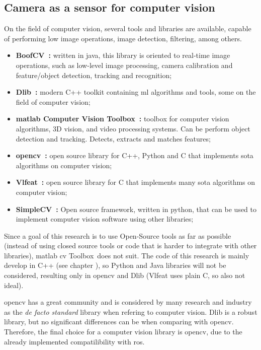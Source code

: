 \subsection{Camera as a sensor for computer vision}
On the field of computer vision, several tools and libraries are available, capable of performing low image operations, image detection, filtering, among others. 

\begin{itemize}
	\item \textbf{BoofCV~\cite{boofcv}:} written in java, this library is oriented to real-time image operations, such as low-level image processing, camera calibration and feature/object  detection, tracking and recognition;
	\item \textbf{Dlib~\cite{dlib}:} modern C++ toolkit containing \acl{ml} algorithms and tools, some on the field of computer vision;
	\item \textbf{\ac{matlab} Computer Vision Toolbox\texttrademark~\cite{matlabcvtoolbox}:} toolbox for computer vision algorithms, 3D vision, and video processing systems. Can be perform object detection and tracking. Detects, extracts and matches features;
	\item \textbf{\acf{opencv}~\cite{opencv}:} open source library for C++, Python and C that implements \acl{sota} algorithms on computer vision;
	\item \textbf{Vlfeat~\cite{vlfeat}:} open source library for C that implements many \acl{sota} algorithms on computer vision;
	\item \textbf{SimpleCV~\cite{simplecv}:} Open source framework, written in python, that can be used to implement computer vision software using other libraries;
\end{itemize}

Since a goal of this research is to use Open-Source tools as far as possible (instead of using closed source tools or code that is harder to integrate with other libraries), \ac{matlab} \acl{cv} Toolbox\texttrademark~does not suit. The code of this research is mainly develop in C++ (see chapter \citeneeded), so Python and Java libraries will not be considered, resulting only in \ac{opencv} and Dlib (Vlfeat uses plain C, so also not ideal). 

\ac{opencv} has a great community and is considered by many research and industry as the \textit{de facto standard} library when refering to computer vision. Dlib is a robust library, but no significant differences can be when comparing with \ac{opencv}. Therefore, the final choice for a computer vision library is \ac{opencv}, due to the already implemented compatilibility with \ac{ros}.



